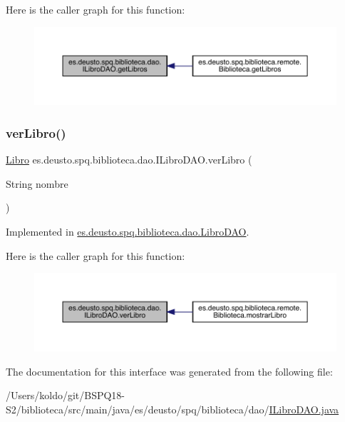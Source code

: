 Here is the caller graph for this function\+:
\nopagebreak
\begin{figure}[H]
\begin{center}
\leavevmode
\includegraphics[width=350pt]{interfacees_1_1deusto_1_1spq_1_1biblioteca_1_1dao_1_1_i_libro_d_a_o_ad8d7e48cb052174072938ca00ace7fea_icgraph}
\end{center}
\end{figure}
\mbox{\label{interfacees_1_1deusto_1_1spq_1_1biblioteca_1_1dao_1_1_i_libro_d_a_o_ae390d687e8e4ec02a401291da5076062}} 
\subsubsection{\texorpdfstring{ver\+Libro()}{verLibro()}}
{\footnotesize\ttfamily \mbox{\hyperlink{classes_1_1deusto_1_1spq_1_1biblioteca_1_1data_1_1_libro}{Libro}} es.\+deusto.\+spq.\+biblioteca.\+dao.\+I\+Libro\+D\+A\+O.\+ver\+Libro (\begin{DoxyParamCaption}\item[{String}]{nombre }\end{DoxyParamCaption})}



Implemented in \mbox{\hyperlink{classes_1_1deusto_1_1spq_1_1biblioteca_1_1dao_1_1_libro_d_a_o_a8138eaa485efda1fa97a158f460301dd}{es.\+deusto.\+spq.\+biblioteca.\+dao.\+Libro\+D\+AO}}.

Here is the caller graph for this function\+:
\nopagebreak
\begin{figure}[H]
\begin{center}
\leavevmode
\includegraphics[width=350pt]{interfacees_1_1deusto_1_1spq_1_1biblioteca_1_1dao_1_1_i_libro_d_a_o_ae390d687e8e4ec02a401291da5076062_icgraph}
\end{center}
\end{figure}


The documentation for this interface was generated from the following file\+:\begin{DoxyCompactItemize}
\item 
/\+Users/koldo/git/\+B\+S\+P\+Q18-\/\+S2/biblioteca/src/main/java/es/deusto/spq/biblioteca/dao/\mbox{\hyperlink{_i_libro_d_a_o_8java}{I\+Libro\+D\+A\+O.\+java}}\end{DoxyCompactItemize}
